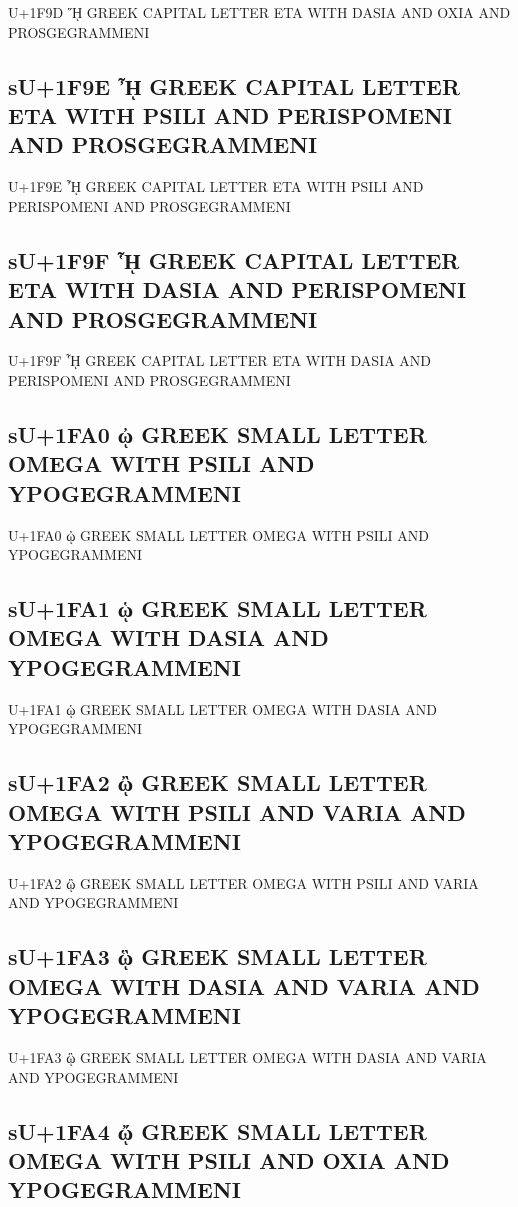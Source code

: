 U+1F9D ᾝ GREEK CAPITAL LETTER ETA WITH DASIA AND OXIA AND PROSGEGRAMMENI

\subsection{sU+1F9E ᾞ GREEK CAPITAL LETTER ETA WITH PSILI AND PERISPOMENI AND PROSGEGRAMMENI}

U+1F9E ᾞ GREEK CAPITAL LETTER ETA WITH PSILI AND PERISPOMENI AND PROSGEGRAMMENI

\subsection{sU+1F9F ᾟ GREEK CAPITAL LETTER ETA WITH DASIA AND PERISPOMENI AND PROSGEGRAMMENI}

U+1F9F ᾟ GREEK CAPITAL LETTER ETA WITH DASIA AND PERISPOMENI AND PROSGEGRAMMENI

\subsection{sU+1FA0 ᾠ GREEK SMALL LETTER OMEGA WITH PSILI AND YPOGEGRAMMENI}

U+1FA0 ᾠ GREEK SMALL LETTER OMEGA WITH PSILI AND YPOGEGRAMMENI

\subsection{sU+1FA1 ᾡ GREEK SMALL LETTER OMEGA WITH DASIA AND YPOGEGRAMMENI}

U+1FA1 ᾡ GREEK SMALL LETTER OMEGA WITH DASIA AND YPOGEGRAMMENI

\subsection{sU+1FA2 ᾢ GREEK SMALL LETTER OMEGA WITH PSILI AND VARIA AND YPOGEGRAMMENI}

U+1FA2 ᾢ GREEK SMALL LETTER OMEGA WITH PSILI AND VARIA AND YPOGEGRAMMENI

\subsection{sU+1FA3 ᾣ GREEK SMALL LETTER OMEGA WITH DASIA AND VARIA AND YPOGEGRAMMENI}

U+1FA3 ᾣ GREEK SMALL LETTER OMEGA WITH DASIA AND VARIA AND YPOGEGRAMMENI

\subsection{sU+1FA4 ᾤ GREEK SMALL LETTER OMEGA WITH PSILI AND OXIA AND YPOGEGRAMMENI}

